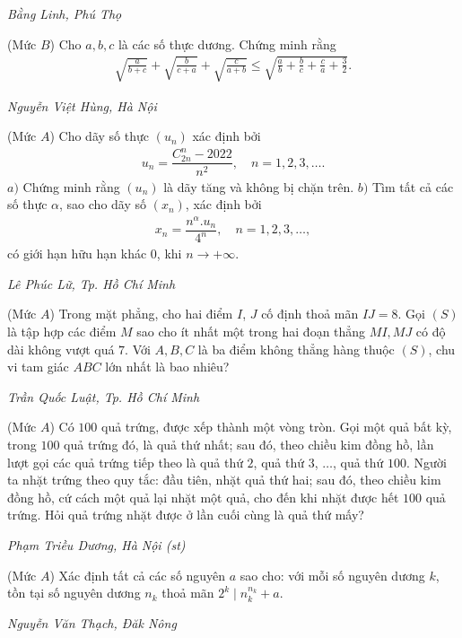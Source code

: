\begin{multicols}{2}
\begin{figure}[H]
	\end{figure}
	\begin{flushright}
		\textit{Bằng Linh, Phú Thọ}
	\end{flushright}
	{}
	(Mức $B$) Cho $a, b, c$ là các số thực dương. Chứng minh rằng
	\begin{align*}
		\sqrt{\!\!\frac{a}{b\!+\!c}}\!+\!\sqrt{\!\!\frac{b}{c\!+\!a}}\!+\!\sqrt{\!\!\frac{c}{a\!+\!b}}
		\!\leq\! \sqrt{\!\!\frac{a}{b}\!+\!\frac{b}{c}\!+\!\frac{c}{a}\!+\!\frac{3}{2}} .
	\end{align*}
	\begin{flushright}
		\textit{Nguyễn Việt Hùng, Hà Nội}
	\end{flushright}
	{}
	(Mức $A$) Cho dãy số thực $(u_n)$ xác định bởi 
	\begin{align*}
		u_n=\dfrac{C^n_{2n}-2022}{n^2},\quad n=1,2,3,\ldots.
	\end{align*}
	$a)$ Chứng minh rằng $(u_n)$ là dãy tăng và không bị chặn trên.
	\vskip 0.05cm
	$b)$ Tìm tất cả các số thực $\alpha$,  sao cho dãy số $(x_n)$, xác định bởi
	\begin{align*}
		x_n=\dfrac{n^\alpha. u_n}{4^n},\quad n=1,2,3,\ldots,
	\end{align*}
	có giới hạn hữu hạn khác $0$, khi $n\to+\infty$.
	\begin{flushright}
		\textit{Lê Phúc Lữ, Tp. Hồ Chí Minh}
	\end{flushright}
	{}
	(Mức $A$) Trong mặt phẳng, cho hai điểm $I$, $J$ cố định thoả mãn $IJ=8$.  Gọi $(S)$ là tập hợp các điểm $M$ sao cho ít nhất một trong hai đoạn thẳng $MI,MJ$ có độ dài không vượt quá $7$. Với $A,B,C$ là ba điểm không thẳng hàng thuộc $(S)$, chu vi tam giác $ABC$ lớn nhất là bao nhiêu?
	\begin{flushright}
		\textit{Trần Quốc Luật, Tp. Hồ Chí Minh}
	\end{flushright}
	{}
	(Mức $A$) Có $100$ quả trứng, được xếp thành một vòng tròn. Gọi một quả bất kỳ, trong $100$ quả trứng đó, là quả thứ nhất; sau đó, theo chiều kim đồng hồ, lần lượt gọi các quả trứng tiếp theo là quả thứ $2$, quả thứ $3$, $\ldots$, quả thứ $100$. Người ta nhặt trứng theo quy tắc: đầu tiên, nhặt quả thứ hai; sau đó, theo chiều kim đồng hồ, cứ cách một quả lại nhặt một quả, cho đến khi nhặt được hết $100$ quả trứng. Hỏi quả trứng nhặt được ở lần cuối cùng là quả thứ mấy?
	\begin{flushright}
		\textit{Phạm Triều Dương, Hà Nội (st)}
	\end{flushright}
	{}
	(Mức $A$) Xác định tất cả các số nguyên $a$ sao cho: với mỗi số nguyên dương $k$, tồn tại số nguyên dương $n_k$ thoả mãn $2^k\mid n_k^{n_k}+a$. 
	\begin{flushright}
		\textit{Nguyễn Văn Thạch, Đăk Nông}
	\end{flushright}
\end{multicols}
